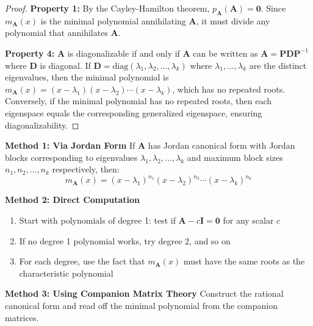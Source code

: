 \documentclass[12pt]{article}
\numberwithin{equation}{section}
\newcommand{\mat}[1]{\mathbf{#1}}        %
\theoremstyle{plain}
\theoremstyle{definition}
\theoremstyle{remark}
\begin{document}
\begin{proof}
\textbf{Property 1:} By the Cayley-Hamilton theorem, $p_{\mat{A}}(\mat{A}) = \mat{0}$. Since $m_{\mat{A}}(x)$ is the minimal polynomial annihilating $\mat{A}$, it must divide any polynomial that annihilates $\mat{A}$.

\textbf{Property 4:} $\mat{A}$ is diagonalizable if and only if $\mat{A}$ can be written as $\mat{A} = \mat{P}\mat{D}\mat{P}^{-1}$ where $\mat{D}$ is diagonal. If $\mat{D} = \text{diag}(\lambda_1, \lambda_2, \ldots, \lambda_k)$ where $\lambda_1, \ldots, \lambda_k$ are the distinct eigenvalues, then the minimal polynomial is $m_{\mat{A}}(x) = (x - \lambda_1)(x - \lambda_2) \cdots (x - \lambda_k)$, which has no repeated roots. Conversely, if the minimal polynomial has no repeated roots, then each eigenspace equals the corresponding generalized eigenspace, ensuring diagonalizability.
\end{proof}

\begin{algorithm}[H]
\caption{Computing the Minimal Polynomial}
\textbf{Method 1: Via Jordan Form}
If $\mat{A}$ has Jordan canonical form with Jordan blocks corresponding to eigenvalues $\lambda_1, \lambda_2, \ldots, \lambda_k$ and maximum block sizes $n_1, n_2, \ldots, n_k$ respectively, then:
$$m_{\mat{A}}(x) = (x - \lambda_1)^{n_1}(x - \lambda_2)^{n_2} \cdots (x - \lambda_k)^{n_k}$$

\textbf{Method 2: Direct Computation}
\begin{enumerate}
\item Start with polynomials of degree 1: test if $\mat{A} - c\mat{I} = \mat{0}$ for any scalar $c$
\item If no degree 1 polynomial works, try degree 2, and so on
\item For each degree, use the fact that $m_{\mat{A}}(x)$ must have the same roots as the characteristic polynomial
\end{enumerate}

\textbf{Method 3: Using Companion Matrix Theory}
Construct the rational canonical form and read off the minimal polynomial from the companion matrices.
\end{algorithm}
\end{document}
